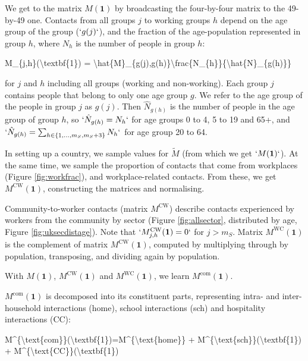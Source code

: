 \documentclass[
]{article}
\newenvironment{Shaded}{\begin{snugshade}}{\end{snugshade}}
\newcommand{\NormalTok}[1]{#1}
\begin{document}
We get to the matrix \(M(\textbf{1})\) by broadcasting the four-by-four matrix to the 49-by-49 one. Contacts from all groups \(j\) to working groups \(h\) depend on the age group of the group (\(`g(j)`\)), and the fraction of the age-population represented in group \(h\), where \(N_{h}\) is the number of people in group \(h\):

\begin{Shaded}
\begin{Highlighting}[]
\NormalTok{M\_\{j,h\}(\textbackslash{}textbf\{1\}) = \textbackslash{}hat\{M\}\_\{g(j),g(h)\}\textbackslash{}frac\{N\_\{h\}\}\{\textbackslash{}hat\{N\}\_\{g(h)\}\}}
\end{Highlighting}
\end{Shaded}

for \(j\) and \(h\) including all groups (working and non-working). Each group \(j\) contains people that belong to only one age group \(g\). We refer to the age group of the people in group \(j\) as \(g(j)\). Then \(\hat{N}_{g(h)}\) is the number of people in the age group of group \(h\), so \(`\hat{N}_{g(h)}=N_{h}`\) for age groups 0 to 4, 5 to 19 and 65+, and \(`\hat{N}_{g(h)}=\sum_{h\in\{1,...,m_S,m_S+3\}}N_{h}`\) for age group 20 to 64.

In setting up a country, we sample values for \(\tilde{M}\) (from which we get \(`M(\textbf{1})`\)). At the same time, we sample the proportion of contacts that come from workplaces (Figure \ref{fig:workfrac}), and workplace-related contacts. From these, we get \(M^{\text{CW}}(\textbf{1})\), constructing the matrices and normalising.

Community-to-worker contacts (matrix \(M^{\text{CW}}\)) describe contacts experienced by workers from the community by sector (Figure \ref{fig:allsector}, distributed by age, Figure \ref{fig:uksecdistage}). Note that \(`M^{\text{CW}}_{j,h}(\textbf{1})=0`\) for \(j>m_S\). Matrix \(M^{\text{WC}}(\textbf{1})\) is the complement of matrix \(M^{\text{CW}}(\textbf{1})\), computed by multiplying through by population, transposing, and dividing again by population.

With \(M(\textbf{1})\), \(M^{\text{CW}}(\textbf{1})\) and \(M^{\text{WC}}(\textbf{1})\), we learn \(M^{\text{com}}(\textbf{1})\).

\(M^{\text{com}}(\textbf{1})\) is decomposed into its constituent parts, representing intra- and inter-household interactions (home), school interactions (sch) and hospitality interactions (CC):

\begin{Shaded}
\begin{Highlighting}[]
\NormalTok{M\^{}\{\textbackslash{}text\{com\}\}(\textbackslash{}textbf\{1\})=M\^{}\{\textbackslash{}text\{home\}\} + M\^{}\{\textbackslash{}text\{sch\}\}(\textbackslash{}textbf\{1\}) + M\^{}\{\textbackslash{}text\{CC\}\}(\textbackslash{}textbf\{1\}) }
\end{Highlighting}
\end{Shaded}
\end{document}
